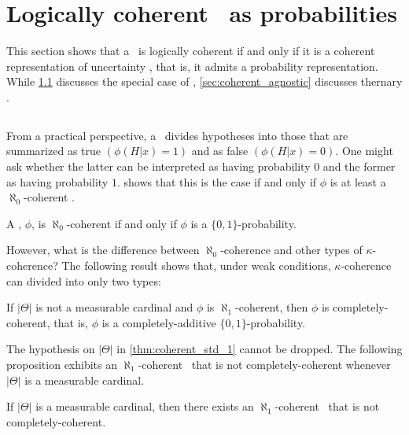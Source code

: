 \section{Logically coherent \summs\ as probabilities}
\label{sec:coh_prob}

This section shows that
a \summ \ is logically coherent if and only if
it is a coherent representation of uncertainty \citep{Finetti1931}, that is,
it admits a probability representation.
While \cref{sec:coherent_standard} 
discusses the special case of 
\stdsumms, \cref{sec:coherent_agnostic} discusses
thernary \summs.

\subsection{\Stdsumms}
\label{sec:coherent_standard}

From a practical perspective,
a \stdsumm \ divides hypotheses
into those that 
are summarized as true $(\phi(H|x) = 1)$
and as false $(\phi(H|x) = 0)$.
One might ask whether
the latter can be interpreted as
having probability $0$ and
the former as having probability $1$.
 shows that
this is the case if and only if
$\phi$ is at least 
a $\aleph_0$-coherent \summ.

\begin{theorem}
 \label{cor:std_prob}
 A \stdsumm, $\phi$, is $\aleph_0$-coherent
 if and only if $\phi$ is
 a $\{0,1\}$-probability.
\end{theorem}

However, what is the difference between
$\aleph_0$-coherence and
other types of $\kappa$-coherence? 
The following result shows that,
under weak conditions,
$\kappa$-coherence can 
divided into only two types:

\begin{theorem}
 \label{thm:coherent_std_1}
 If $|\Theta|$ is not a measurable cardinal
 \citep{Ulam1930} and $\phi$ is $\aleph_1$-coherent, then $\phi$ is completely-coherent, that is, $\phi$ is a completely-additive $\{0,1\}$-probability.
\end{theorem}

The hypothesis on $|\Theta|$ in \cref{thm:coherent_std_1} cannot be dropped. The following proposition exhibits an $\aleph_1$-coherent \stdsumm \ that is not completely-coherent whenever $|\Theta|$ is a measurable cardinal.

\begin{proposition}
 \label{prop:coherent_std_1}
 If $|\Theta|$ is a measurable cardinal, then there exists an $\aleph_1$-coherent \stdsumm \ that is not completely-coherent.
\end{proposition}

